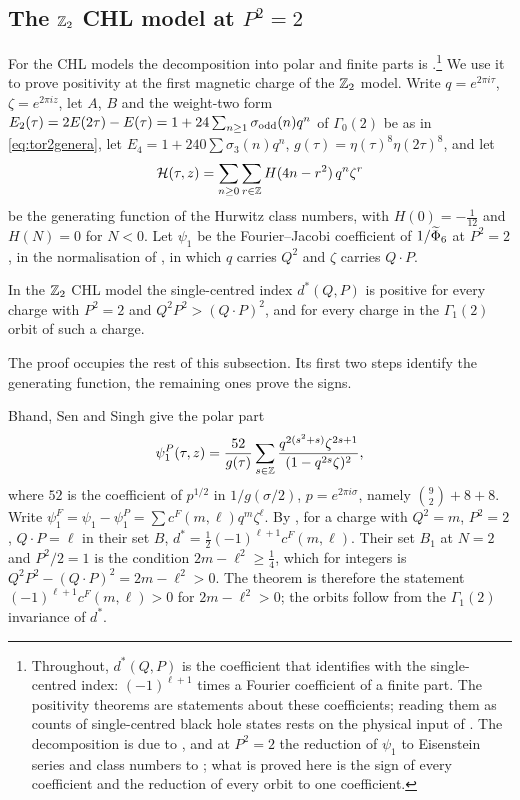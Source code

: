\subsection{The \texorpdfstring{$\mathbb{Z}_2$}{Z2} CHL model at \texorpdfstring{$P^2=2$}{P2=2}}\label{ssec:chlpositivity}

For the CHL models the decomposition into polar and finite parts is \cite{BSS25}.\footnote{Throughout, $d^*(Q,P)$ is the coefficient that \cite[Theorem~5.4]{BSS25} identifies with the single-centred index: $(-1)^{\ell+1}$ times a Fourier coefficient of a finite part. The positivity theorems are statements about these coefficients; reading them as counts of single-centred black hole states rests on the physical input of \cite{Sen11positivity,BSS25}. The decomposition is due to \cite{BSS25}, and at $P^2=2$ the reduction of $\psi_1$ to Eisenstein series and class numbers to \cite{CD19}; what is proved here is the sign of every coefficient and the reduction of every orbit to one coefficient.} We use it to prove positivity at the first magnetic charge of the $\mathbb{Z}_2$ model. Write $q=e^{2\pi i\tau}$, $\zeta=e^{2\pi iz}$, let $A$, $B$ and the weight-two form $E_2(\tau)=2E(2\tau)-E(\tau)=1+24\sum_{n\ge1}\sigma_{\rm odd}(n)q^n$ of $\Gamma_0(2)$ be as in \eqref{eq:tor2genera}, let $E_4=1+240\sum\sigma_3(n)q^n$, $g(\tau)=\eta(\tau)^8\eta(2\tau)^8$, and let
\[
\mathcal H(\tau,z)=\sum_{n\ge0}\sum_{r\in\mathbb{Z}}H(4n-r^2)\,q^n\zeta^r
\]
be the generating function of the Hurwitz class numbers, with $H(0)=-\tfrac1{12}$ and $H(N)=0$ for $N<0$. Let $\psi_1$ be the Fourier--Jacobi coefficient of $1/\widetilde{\Phi}_6$ at $P^2=2$, in the normalisation of \cite{BSS25}, in which $q$ carries $Q^2$ and $\zeta$ carries $Q\cdot P$.

\begin{theorem}\label{thm:chlpositivity}
In the $\mathbb{Z}_2$ CHL model the single-centred index $d^*(Q,P)$ is positive for every charge with $P^2=2$ and $Q^2P^2>(Q\cdot P)^2$, and for every charge in the $\Gamma_1(2)$ orbit of such a charge.
\end{theorem}

The proof occupies the rest of this subsection. Its first two steps identify the generating function, the remaining ones prove the signs.

 Bhand, Sen and Singh \cite[(5.45)]{BSS25} give the polar part
\begin{equation}\label{eq:chlpolar}
\psi_1^P(\tau,z)=\frac{52}{g(\tau)}\sum_{s\in\mathbb{Z}}\frac{q^{2(s^2+s)}\zeta^{2s+1}}{(1-q^{2s}\zeta)^2},
\end{equation}
where $52$ is the coefficient of $p^{1/2}$ in $1/g(\sigma/2)$, $p=e^{2\pi i\sigma}$, namely $\binom92+8+8$. Write $\psi_1^F=\psi_1-\psi_1^P=\sum c^F(m,\ell)q^m\zeta^\ell$. By \cite[Theorem~5.4(b)]{BSS25}, for a charge with $Q^2=m$, $P^2=2$, $Q\cdot P=\ell$ in their set $B$, $d^*=\tfrac12(-1)^{\ell+1}c^F(m,\ell)$. Their set $B_1$ \cite[(5.65)]{BSS25} at $N=2$ and $P^2/2=1$ is the condition $2m-\ell^2\ge\tfrac14$, which for integers is $Q^2P^2-(Q\cdot P)^2=2m-\ell^2>0$. The theorem is therefore the statement $(-1)^{\ell+1}c^F(m,\ell)>0$ for $2m-\ell^2>0$; the orbits follow from the $\Gamma_1(2)$ invariance of $d^*$.

